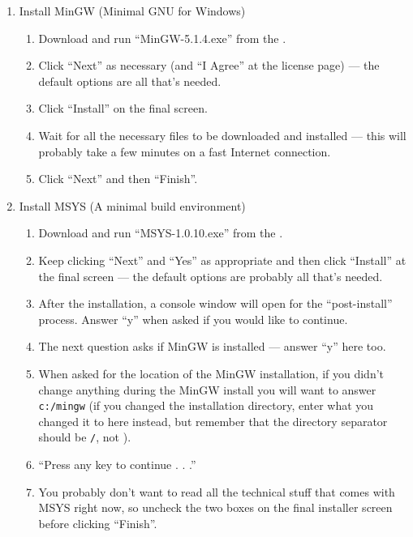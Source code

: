 \begin{enumerate}

\item Install MinGW (Minimal GNU for Windows)
    \begin{enumerate}
    \item Download and run ``MinGW-5.1.4.exe'' from the 
.
    \item Click ``Next'' as necessary (and ``I Agree'' at the license page) --- the default options 
are all that's needed.
    \item Click ``Install'' on the final screen.
    \item Wait for all the necessary files to be downloaded and installed --- this will probably 
take a few minutes on a fast Internet connection.
    \item Click ``Next'' and then ``Finish''.
    \end{enumerate}

\item Install MSYS (A minimal build environment)
    \begin{enumerate}
    \item Download and run ``MSYS-1.0.10.exe'' from the 
    .
    \item Keep clicking ``Next'' and ``Yes'' as appropriate and then click ``Install'' at the final 
screen --- the default options are probably all that's needed.
    \item After the installation, a console window will open for the ``post-install'' process.  
Answer ``y'' when asked if you would like to continue.
    \item The next question asks if MinGW is installed --- answer ``y'' here too.
    \item When asked for the location of the MinGW installation, if you didn't change anything 
during the MinGW install you will want to answer \texttt{c:/mingw} (if you changed the installation 
directory, enter what you changed it to here instead, but remember that the directory separator 
should be \texttt{/}, not \texttt{\bslash}).
    \item ``Press any key to continue . . .''
    \item You probably don't want to read all the technical stuff that comes with MSYS right now, so 
uncheck the two boxes on the final installer screen before clicking ``Finish''.
    \end{enumerate}


\end{enumerate}
